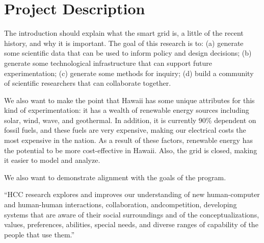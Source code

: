 
\renewcommand{\thepage} {C--\arabic{page}}

\renewcommand{\thesection} {C.\arabic{section}}
\setcounter{section}{0}

\section{Project Description}

The introduction should explain what the smart grid is, a little of the recent history, and why it is important. The goal of this research is to: (a) generate some scientific data that can be used to inform policy and design decisions; (b) generate some technological infrastructure that can support future experimentation; (c) generate some methods for inquiry; (d) build a community of scientific researchers that can collaborate together.

We also want to make the point that Hawaii has some unique attributes for this kind of experimentation: it has a wealth of renewable energy sources including solar, wind, wave, and geothermal.  In addition, it is currently 90\% dependent on fossil fuels, and these fuels are very expensive, making our electrical costs the most expensive in the nation.  As a result of these factors, renewable energy has the potential to be more cost-effective in Hawaii.  Also, the grid is closed, making it easier to model and analyze. 

We also want to demonstrate alignment with the goals of the program.

``HCC research explores and improves our understanding of new
human-computer and human-human interactions, collaboration, andcompetition, developing systems that are aware of their social surroundings
and of the conceptualizations, values, preferences, abilities, special
needs, and diverse ranges of capability of the people that use them.''









 










